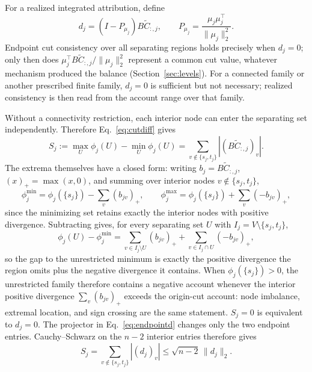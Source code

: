 \documentclass[a4paper,fleqn]{cas-sc}
\newcommand{\norm}[1]{\lVert #1 \rVert}
\begin{document}
For a realized integrated attribution, define
\begin{equation}
d_j=(I-P_{\mu_j})B\widetilde C_{:,j},\qquad
P_{\mu_j}=\frac{\mu_j\mu_j^\top}{\norm{\mu_j}_2^2}.
\label{eq:endpointd}
\end{equation}
Endpoint cut consistency over all separating regions holds precisely when
$d_j=0$; only then does
$\mu_j^\top B\widetilde C_{:,j}/\norm{\mu_j}_2^2$ represent a common cut
value, whatever mechanism produced the balance
(Section~\ref{sec:levels}). For a connected family or another prescribed
finite family, $d_j=0$ is sufficient but not necessary; realized
consistency is then read from the account range over that family.

Without a connectivity restriction, each interior node can enter the
separating set independently. Therefore Eq.~\eqref{eq:cutdiff} gives
\begin{equation}
S_j:=\max_U\phi_j(U)-\min_U\phi_j(U)
=\sum_{v\notin\{s_j,t_j\}}|(B\widetilde C_{:,j})_v|.
\label{eq:cutspread}
\end{equation}
The extrema themselves have a closed form: writing $b_j=B\widetilde
C_{:,j}$, $(x)_+=\max(x,0)$, and summing over interior nodes
$v\notin\{s_j,t_j\}$,
\begin{equation}
\phi_j^{\min}=\phi_j(\{s_j\})-\sum_v(b_{jv})_+,
\qquad
\phi_j^{\max}=\phi_j(\{s_j\})+\sum_v(-b_{jv})_+,
\label{eq:cutextrema}
\end{equation}
since the minimizing set retains exactly the interior nodes with
positive divergence. Subtracting gives, for every separating set $U$
with $I_j=V\setminus\{s_j,t_j\}$,
\begin{equation}
\phi_j(U)-\phi_j^{\min}
=\sum_{v\in I_j\setminus U}(b_{jv})_+
+\sum_{v\in I_j\cap U}(-b_{jv})_+,
\label{eq:cutgap}
\end{equation}
so the gap to the unrestricted minimum is exactly the positive
divergence the region omits plus the negative divergence it contains.
When $\phi_j(\{s_j\})>0$, the unrestricted family
therefore contains a negative account whenever the interior positive
divergence $\sum_v(b_{jv})_+$ exceeds the origin-cut account: node
imbalance, extremal location, and sign crossing are the same statement.
$S_j=0$ is equivalent to $d_j=0$.
The projector in Eq.~\eqref{eq:endpointd} changes only the two endpoint
entries. Cauchy--Schwarz on the $n-2$ interior entries therefore gives
\begin{equation}
S_j=\sum_{v\notin\{s_j,t_j\}}|(d_j)_v|
\le\sqrt{n-2}\,\norm{d_j}_2.
\label{eq:rangebound}
\end{equation}
\end{document}
